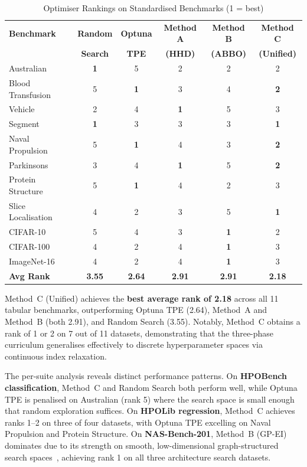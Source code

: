 \documentclass[11pt]{article}
\begin{document}
\begin{table}[H]
\centering
\caption{Optimiser Rankings on Standardised Benchmarks (1 = best)}
\label{tab:hpobench_rankings}
\begin{tabular}{lccccc}
\toprule
\textbf{Benchmark} & \textbf{Random} & \textbf{Optuna} & \textbf{Method A} & \textbf{Method B} & \textbf{Method C} \\
 & \textbf{Search} & \textbf{TPE} & \textbf{(HHD)} & \textbf{(ABBO)} & \textbf{(Unified)} \\
\midrule
Australian          & \textbf{1} & 5 & 2 & 2 & 2 \\
Blood Transfusion   & 5 & \textbf{1} & 3 & 4 & \textbf{2} \\
Vehicle             & 2 & 4 & \textbf{1} & 5 & 3 \\
Segment             & \textbf{1} & 3 & 3 & 3 & \textbf{1} \\
\midrule
Naval Propulsion    & 5 & \textbf{1} & 4 & 3 & \textbf{2} \\
Parkinsons          & 3 & 4 & \textbf{1} & 5 & \textbf{2} \\
Protein Structure   & 5 & \textbf{1} & 4 & 2 & 3 \\
Slice Localisation  & 4 & 2 & 3 & 5 & \textbf{1} \\
\midrule
CIFAR-10            & 5 & 4 & 3 & \textbf{1} & 2 \\
CIFAR-100           & 4 & 2 & 4 & \textbf{1} & 3 \\
ImageNet-16         & 4 & 2 & 4 & \textbf{1} & 3 \\
\midrule
\textbf{Avg Rank}   & \textbf{3.55} & \textbf{2.64} & \textbf{2.91} & \textbf{2.91} & \textbf{2.18} \\
\bottomrule
\end{tabular}
\end{table}

Method~C (Unified) achieves the \textbf{best average rank of 2.18}
across all 11 tabular benchmarks, outperforming Optuna TPE (2.64),
Method~A and Method~B (both 2.91), and Random Search (3.55).
Notably, Method~C obtains a rank of 1 or 2 on 7 out of 11 datasets,
demonstrating that the three-phase curriculum generalises effectively
to discrete hyperparameter spaces via continuous index relaxation.

The per-suite analysis reveals distinct performance patterns.
On \textbf{HPOBench classification}, Method~C and Random Search both
perform well, while Optuna TPE is penalised on Australian (rank 5)
where the search space is small enough that random exploration
suffices.  On \textbf{HPOLib regression}, Method~C achieves ranks
1--2 on three of four datasets, with Optuna TPE excelling on
Naval Propulsion and Protein Structure.  On \textbf{NAS-Bench-201},
Method~B (GP-EI) dominates due to its strength on smooth,
low-dimensional graph-structured search spaces~\cite{dong2020nasbench201},
achieving rank 1 on all three architecture search datasets.
\end{document}
